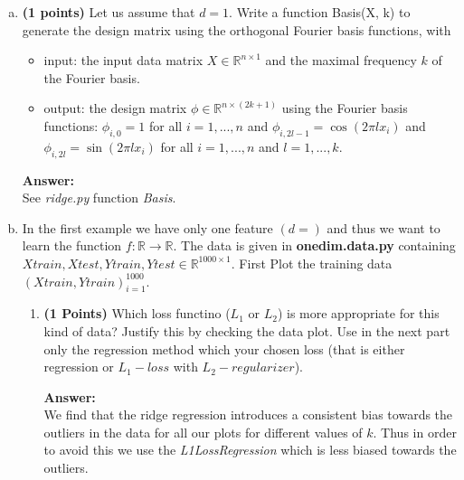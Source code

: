 \documentclass{./tufte-handout}
\begin{document}
\begin{enumerate}[(a)]
\item  \textbf{(1 points)} Let us assume that $d =1$. Write a function Basis(X, k) to generate the design matrix using 
the orthogonal Fourier basis functions, with
\begin{itemize}
    \item input: the input data matrix $X \in \mathbb{R}^{n \times 1}$ and 
    the maximal frequency $k$ of the Fourier basis. 
    \item output: the design matrix $\phi \in \mathbb{R}^{n \times (2k+1)}$  
    using the Fourier basis functions: 
    $\phi_{i,0} = 1$ for all $i = 1, . . . , n$ and 
    $\phi_{i,2l-1} = \cos(2\pi l x_i)$ and 
    $\phi_{i,2l} = \sin(2\pi l x_i)$ for all 
    $i = 1, . . . , n$ and $l = 1, . . . , k$.
\end{itemize}

\textbf{Answer:}\\

See \emph{ridge.py} function \emph{ Basis}. 


\item  In the first example we have only one feature $(d = )$ and thus we want to learn the function $f: \mathbb{R} \to \mathbb{R}$.  The data is given in \textbf{onedim.data.py} containing $Xtrain, Xtest, Ytrain, Ytest \in \mathbb{R}^{1000 \times 1}$.  First Plot the training data ${(Xtrain, Ytrain)}_{i=1}^{1000}$.

\begin{enumerate}
    \item \textbf{(1 Points)} Which loss functino ($L_1$ or $L_2$) is more appropriate for this
   kind of data? Justify this by checking the data plot.  Use in the next part only the regression method
   which your chosen loss (that is either regression or $L_1-loss$ with $L_2-regularizer$).

    \textbf{Answer:} \\
    We find that the ridge regression introduces a consistent bias  
    towards the outliers in the data for  all our plots for different 
    values of $k$. Thus in order to avoid this we use the \emph{L1LossRegression} 
    which is less biased towards the outliers.


\end{enumerate}
\end{enumerate}
\end{document}

